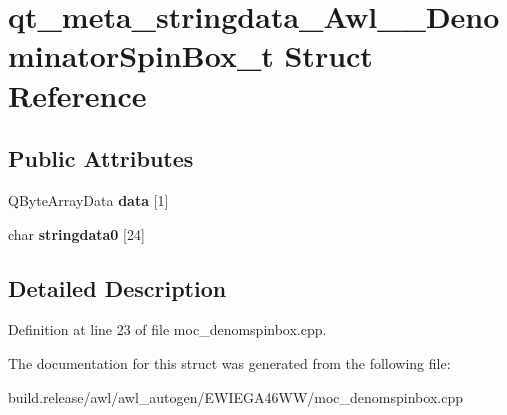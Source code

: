 \hypertarget{structqt__meta__stringdata___awl_____denominator_spin_box__t}{}\section{qt\+\_\+meta\+\_\+stringdata\+\_\+\+Awl\+\_\+\+\_\+\+Denominator\+Spin\+Box\+\_\+t Struct Reference}
\label{structqt__meta__stringdata___awl_____denominator_spin_box__t}
\subsection*{Public Attributes}
\begin{DoxyCompactItemize}
\item 
\mbox{\label{structqt__meta__stringdata___awl_____denominator_spin_box__t_af433bbe6cc7408ef7c20fcedfc259140}} 
Q\+Byte\+Array\+Data {\bfseries data} \mbox{[}1\mbox{]}
\item 
\mbox{\label{structqt__meta__stringdata___awl_____denominator_spin_box__t_a9d96e9c88f0ee0265bcb9f4bbecd0f5b}} 
char {\bfseries stringdata0} \mbox{[}24\mbox{]}
\end{DoxyCompactItemize}


\subsection{Detailed Description}


Definition at line 23 of file moc\+\_\+denomspinbox.\+cpp.



The documentation for this struct was generated from the following file\+:\begin{DoxyCompactItemize}
\item 
build.\+release/awl/awl\+\_\+autogen/\+E\+W\+I\+E\+G\+A46\+W\+W/moc\+\_\+denomspinbox.\+cpp\end{DoxyCompactItemize}

